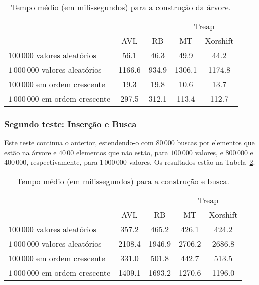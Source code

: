 \begin{table}[h]
    \centering
    \begin{tabular}{l c c c c}
        & & & \multicolumn{2}{c}{Treap} \\ \cmidrule{4-5}
            & AVL & RB & MT & Xorshift \\
        \midrule
        $100\,000$ valores aleatórios & 56.1 & 46.3 & 49.9 & 44.2 \\
        $1\,000\,000$ valores aleatórios & 1166.6 & 934.9 & 1306.1 & 1174.8 \\
        $100\,000$ em ordem crescente & 19.3 & 19.8 & 10.6 & 13.7 \\
        $1\,000\,000$ em ordem crescente & 297.5 & 312.1 & 113.4 & 112.7 \\
        \bottomrule
    \end{tabular}
    \caption{Tempo médio (em milissegundos) para a construção da árvore.}
    \label{tab:insert}
\end{table}

\subsubsection{Segundo teste: Inserção e Busca}

Este teste continua o anterior,
estendendo-o com $80\,000$ buscas por elementos que estão na árvore
e $40\,00$ elementos que não estão, para $100\,000$ valores,
e $800\,000$ e $400\,000$, respectivamente, para $1\,000\,000$ valores.
Os resultados estão na Tabela~\ref{tab:insert-remove}.

\begin{table}[h]
    \centering
    \begin{tabular}{l c c c c}
        & & & \multicolumn{2}{c}{Treap} \\ \cmidrule{4-5}
            & AVL & RB & MT & Xorshift \\
        \midrule
        $100\,000$ valores aleatórios & 357.2 & 465.2 & 426.1 & 424.2 \\
        $1\,000\,000$ valores aleatórios & 2108.4 & 1946.9 & 2706.2 & 2686.8 \\
        $100\,000$ em ordem crescente & 331.0 & 501.8 & 442.7 & 513.5 \\
        $1\,000\,000$ em ordem crescente & 1409.1 & 1693.2 & 1270.6 & 1196.0 \\
        \bottomrule
    \end{tabular}
    \caption{Tempo médio (em milissegundos) para a construção e busca.}
    \label{tab:insert-remove}
\end{table}

